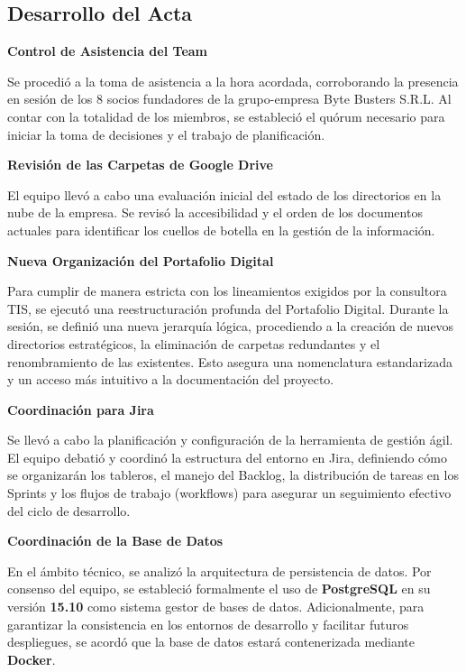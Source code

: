 \newpage
\subsection{Desarrollo del Acta}

\noindent \textbf{Control de Asistencia del Team}\par
Se procedió a la toma de asistencia a la hora acordada, corroborando la presencia en sesión de los 8 socios fundadores de la grupo-empresa Byte Busters S.R.L. Al contar con la totalidad de los miembros, se estableció el quórum necesario para iniciar la toma de decisiones y el trabajo de planificación.

\vspace*{0.5cm}
\noindent\textbf{Revisión de las Carpetas de Google Drive}\par
El equipo llevó a cabo una evaluación inicial del estado de los directorios en la nube de la empresa. Se revisó la accesibilidad y el orden de los documentos actuales para identificar los cuellos de botella en la gestión de la información.

\vspace*{0.5cm}
\noindent \textbf{Nueva Organización del Portafolio Digital}\par
Para cumplir de manera estricta con los lineamientos exigidos por la consultora TIS, se ejecutó una reestructuración profunda del Portafolio Digital. Durante la sesión, se definió una nueva jerarquía lógica, procediendo a la creación de nuevos directorios estratégicos, la eliminación de carpetas redundantes y el renombramiento de las existentes. Esto asegura una nomenclatura estandarizada y un acceso más intuitivo a la documentación del proyecto.

\vspace*{0.5cm}
\noindent \textbf{Coordinación para Jira}\par
Se llevó a cabo la planificación y configuración de la herramienta de gestión ágil. El equipo debatió y coordinó la estructura del entorno en Jira, definiendo cómo se organizarán los tableros, el manejo del Backlog, la distribución de tareas en los Sprints y los flujos de trabajo (workflows) para asegurar un seguimiento efectivo del ciclo de desarrollo.

\vspace*{0.5cm}
\noindent \textbf{Coordinación de la Base de Datos}\par
En el ámbito técnico, se analizó la arquitectura de persistencia de datos. Por consenso del equipo, se estableció formalmente el uso de \textbf{PostgreSQL} en su versión \textbf{15.10} como sistema gestor de bases de datos. Adicionalmente, para garantizar la consistencia en los entornos de desarrollo y facilitar futuros despliegues, se acordó que la base de datos estará contenerizada mediante \textbf{Docker}.

